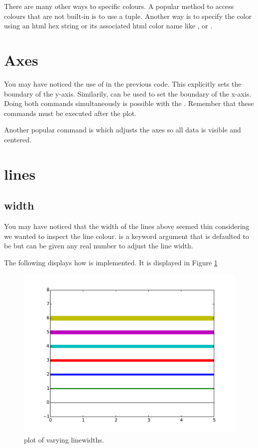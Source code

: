 There are many other ways to specific colours. A popular method to access colours that are not built-in is to use a  tuple. Another way is to specify the color using an html hex string or its associated html color name like , or . 

\section*{Axes}
You may have noticed the use of  in the previous code. This explicitly sets the boundary of the y-axis. Similarily,  can be used to set the boundary of the x-axis. 
Doing both commands simultaneously is possible with the . 
Remember that these commands must be executed after the plot. 

Another popular command is  which adjusts the axes so all data is visible and centered. 

\section*{lines}
\subsection*{width}
You may have noticed that the width of the lines above seemed thin considering we wanted to inspect the line colour.  is a keyword argument that is defaulted to be  but can be given any real number to adjust the line width. 

The following displays how  is implemented. It is displayed in Figure \ref{linewidth}


\begin{figure} 
\includegraphics[width=\textwidth]{linewidth.pdf}
\caption{plot of varying linewidths.}
\label{linewidth} 
\end{figure}

